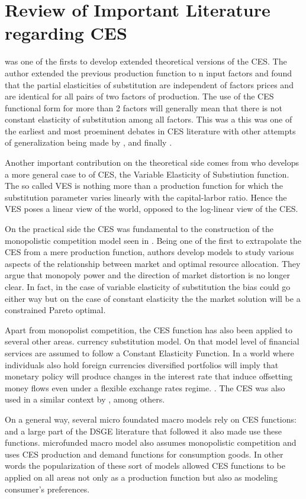 \section{Review of Important Literature regarding CES}
\cite{Uzawa1962} was one of the firsts to develop extended theoretical versions of the CES. The author extended the previous production function to n input factors and found that the partial elasticities of substitution are independent of factors prices and are identical for all pairs of two factors of production. The use of the CES functional form for more than 2 factors will generally mean that there is not constant elasticity of substitution among all factors. This was a this was one of the earliest and most proeminent debates in CES literature with other attempts of generalization being made by \cite{mcfadden1963constant}, \cite{mukerji1963generalized}
and finally \cite{sato1967}. \par

Another important contribution on the theoretical side comes from \cite{revankar1971class} who develops a more general case to of CES, the  Variable Elasticity of Substiution function. The so called VES is nothing more than a production function for which the substitution parameter varies linearly with the capital-larbor ratio. Hence the VES poses a linear view of the world, opposed to the log-linear view of the CES. \par

On the practical side the CES was fundamental to the construction of the monopolistic competition model seen in \cite{DixitStiglitz1977}. Being one of the first to extrapolate the CES from a mere production function, authors develop models to study various aspects of the relationship between market and optimal resource allocation. They argue that monopoly power and the direction of market distortion is no longer clear. In fact, in the case of variable elasticity of substitution the bias could go either way but on the case of constant elasticity the  the market solution will be a constrained Pareto optimal.\par

Apart from monopolist competition, the CES function has also been applied to several other areas. \cite{miles1978} currency substitution model. On that model level of financial services are assumed to follow a Constant Elasticity Function. In a world where individuals also hold foreign currencies diversified portfolios will imply that monetary policy will produce changes in the interest rate that induce offsetting money flows even under a flexible exchange rates regime. \cite{Krugman1991}. The CES was also used in a similar context by \cite{Armington1969} \cite{Krugman1991}, \cite{Melitz2003} among others.

On a general way, several micro foundated macro models rely on CES functions:  \cite{Kydland1982} and a large part of the DSGE literature that followed it also made use these functions. \cite{BlanchardKiyotaki1987} microfunded macro model also assumes monopolistic competition and uses CES production and demand functions for consumption goods. In other words the popularization of these sort of models allowed CES functions to be applied on all areas not only as a production function but also as modeling consumer's preferences. 